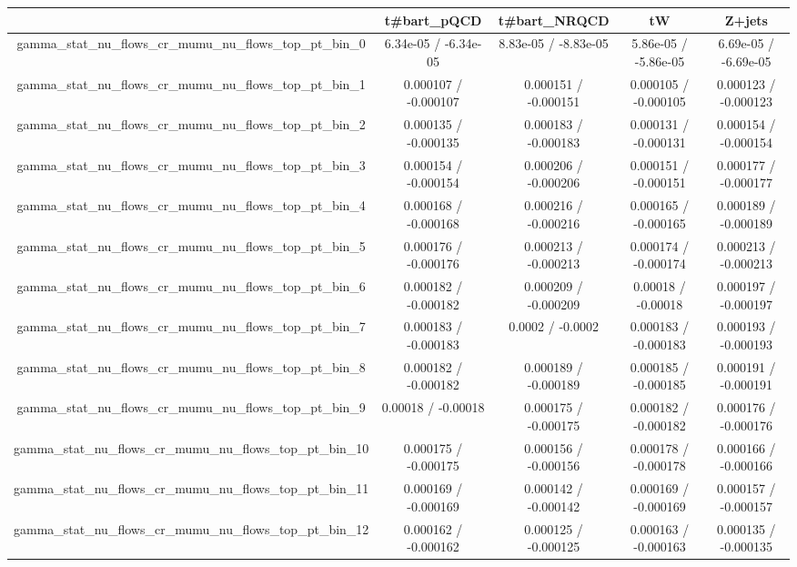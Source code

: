 \documentclass[10pt]{article}
\begin{document}
\begin{table}[htbp]
\begin{center}
\begin{tabular}{|c|c|c|c|c|}
\hline 
      & t#bar{t}_{pQCD}      & t#bar{t}_{NRQCD}      & tW      & Z+jets \\ 
\hline 
  gamma_stat_nu_flows_cr_mumu_nu_flows_top_pt_bin_0 & 6.34e-05 / -6.34e-05 & 8.83e-05 / -8.83e-05 & 5.86e-05 / -5.86e-05 & 6.69e-05 / -6.69e-05 \\ 
  gamma_stat_nu_flows_cr_mumu_nu_flows_top_pt_bin_1 & 0.000107 / -0.000107 & 0.000151 / -0.000151 & 0.000105 / -0.000105 & 0.000123 / -0.000123 \\ 
  gamma_stat_nu_flows_cr_mumu_nu_flows_top_pt_bin_2 & 0.000135 / -0.000135 & 0.000183 / -0.000183 & 0.000131 / -0.000131 & 0.000154 / -0.000154 \\ 
  gamma_stat_nu_flows_cr_mumu_nu_flows_top_pt_bin_3 & 0.000154 / -0.000154 & 0.000206 / -0.000206 & 0.000151 / -0.000151 & 0.000177 / -0.000177 \\ 
  gamma_stat_nu_flows_cr_mumu_nu_flows_top_pt_bin_4 & 0.000168 / -0.000168 & 0.000216 / -0.000216 & 0.000165 / -0.000165 & 0.000189 / -0.000189 \\ 
  gamma_stat_nu_flows_cr_mumu_nu_flows_top_pt_bin_5 & 0.000176 / -0.000176 & 0.000213 / -0.000213 & 0.000174 / -0.000174 & 0.000213 / -0.000213 \\ 
  gamma_stat_nu_flows_cr_mumu_nu_flows_top_pt_bin_6 & 0.000182 / -0.000182 & 0.000209 / -0.000209 & 0.00018 / -0.00018 & 0.000197 / -0.000197 \\ 
  gamma_stat_nu_flows_cr_mumu_nu_flows_top_pt_bin_7 & 0.000183 / -0.000183 & 0.0002 / -0.0002 & 0.000183 / -0.000183 & 0.000193 / -0.000193 \\ 
  gamma_stat_nu_flows_cr_mumu_nu_flows_top_pt_bin_8 & 0.000182 / -0.000182 & 0.000189 / -0.000189 & 0.000185 / -0.000185 & 0.000191 / -0.000191 \\ 
  gamma_stat_nu_flows_cr_mumu_nu_flows_top_pt_bin_9 & 0.00018 / -0.00018 & 0.000175 / -0.000175 & 0.000182 / -0.000182 & 0.000176 / -0.000176 \\ 
  gamma_stat_nu_flows_cr_mumu_nu_flows_top_pt_bin_10 & 0.000175 / -0.000175 & 0.000156 / -0.000156 & 0.000178 / -0.000178 & 0.000166 / -0.000166 \\ 
  gamma_stat_nu_flows_cr_mumu_nu_flows_top_pt_bin_11 & 0.000169 / -0.000169 & 0.000142 / -0.000142 & 0.000169 / -0.000169 & 0.000157 / -0.000157 \\ 
  gamma_stat_nu_flows_cr_mumu_nu_flows_top_pt_bin_12 & 0.000162 / -0.000162 & 0.000125 / -0.000125 & 0.000163 / -0.000163 & 0.000135 / -0.000135 \\ 

\end{tabular}
\end{center}
\end{table}
\end{document}

